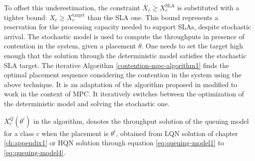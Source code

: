   To offset this underestimation, the constraint $X_c \ge X_{c}^\text{SLA}$ is substituted with a tighter bound: $X_c \ge X_{c}^\text{target}$ than the SLA one. This bound represents a reservation for the processing capacity needed to support SLAs, despite stochastic arrival. The stochastic model is used to compute the throughputs in presence of contention in the system, given a placement $\theta$. One needs to set the target high enough that the solution through the deterministic model satisfies the stochastic SLA target. The iterative Algorithm \ref{contention-mpc-algorithm1} finds the optimal placement sequence considering the contention in the system using the above technique. It is an adaptation of the algorithm proposed in \cite{li2011fast} modified to work in the context of MPC. It iteratively switches between the optimization of the deterministic model and solving the stochastic one.   

 $X^Q_c(\theta^i)$ in the algorithm, denotes the throughput solution of the queuing model for a class $c$ when the placement is $\theta^i$, obtained from LQN solution of chapter  \ref{ch:appendix1}  or HQN solution through equation \ref{eq:queuing-model1} to \ref{eq:queuing-model4}.         

